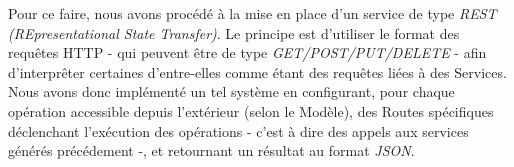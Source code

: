 Pour ce faire, nous avons procédé à la mise en place d'un service de type \textit{REST (REpresentational State Transfer)}.
Le principe est d'utiliser le format des requêtes HTTP - qui peuvent être de type \textit{GET/POST/PUT/DELETE} - afin d'interprêter certaines d'entre-elles comme étant des requêtes liées à des Services.
Nous avons donc implémenté un tel système en configurant, pour chaque opération accessible depuis l'extérieur (selon le Modèle), des Routes spécifiques déclenchant l'exécution des opérations - c'est à dire des appels aux services générés précédement -, et retournant un résultat au format \textit{JSON}.


\clearpage
